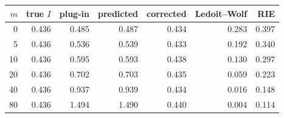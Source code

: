 \begin{tabular}{rrrrrrr}
\toprule
$m$ & true $I$ & plug-in & predicted & corrected & Ledoit--Wolf & RIE\\
\midrule
0 & 0.436 & 0.485 & 0.487 & 0.434 & 0.283 & 0.397 \\
5 & 0.436 & 0.536 & 0.539 & 0.433 & 0.192 & 0.340 \\
10 & 0.436 & 0.595 & 0.593 & 0.438 & 0.130 & 0.297 \\
20 & 0.436 & 0.702 & 0.703 & 0.435 & 0.059 & 0.223 \\
40 & 0.436 & 0.937 & 0.939 & 0.434 & 0.016 & 0.148 \\
80 & 0.436 & 1.494 & 1.490 & 0.440 & 0.004 & 0.114 \\
\bottomrule
\end{tabular}
